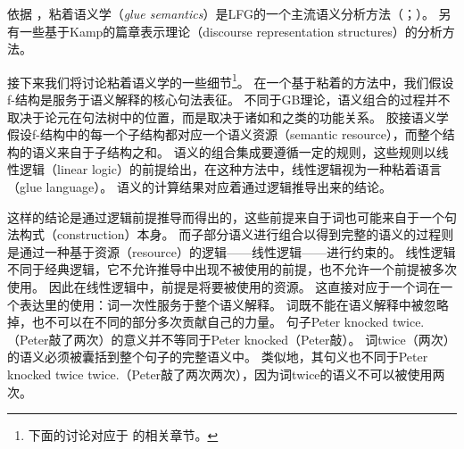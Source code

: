 依据 \citet[--92]{Dalrymple2006a}，粘着语义学（\emph{glue semantics}）是LFG的一个主流语义分析方法（\citealp*{DLS93a-u}；\citealp[\S~8]{Dalrymple2001a-u}）。
另有一些基于Kamp的篇章表示理论（discourse representation structures）\citep{KR93a}的分析方法\citep{FR83b,FR83a}。

接下来我们将讨论粘着语义学的一些细节\footnote{%
下面的讨论对应于 的相关章节。
}。
在一个基于粘着的方法中，我们假设f-结构是服务于语义解释的核心句法表征。
不同于GB理论，语义组合的过程并不取决于论元在句法树中的位置，而是取决于诸如\lfgsubj 和\lfgobj 之类的功能关系。 
胶接语义学假设f-结构中的每一个子结构都对应一个语义资源（semantic resource），而整个结构的语义来自于子结构之和。
语义的组合集成要遵循一定的规则，这些规则以线性逻辑（linear logic）的前提给出，在这种方法中，线性逻辑视为一种粘着语言（glue language）。
语义的计算结果对应着通过逻辑推导出来的结论。

这样的结论是通过逻辑前提推导而得出的，这些前提来自于词也可能来自于一个句法构式（construction）本身。
而子部分语义进行组合以得到完整的语义的过程则是通过一种基于资源（resource）的逻辑——线性逻辑——进行约束的。
线性逻辑不同于经典逻辑，它不允许推导中出现不被使用的前提，也不允许一个前提被多次使用。
因此在线性逻辑中，前提是将要被使用的资源。
这直接对应于一个词在一个表达里的使用：词一次性服务于整个语义解释。
词既不能在语义解释中被忽略掉，也不可以在不同的部分多次贡献自己的力量。
句子Peter knocked twice.（Peter敲了两次）的意义并不等同于Peter knocked（Peter敲）。
词twice（两次）的语义必须被囊括到整个句子的完整语义中。
类似地，其句义也不同于Peter knocked twice twice.（Peter敲了两次两次），因为词twice的语义不可以被使用两次。

